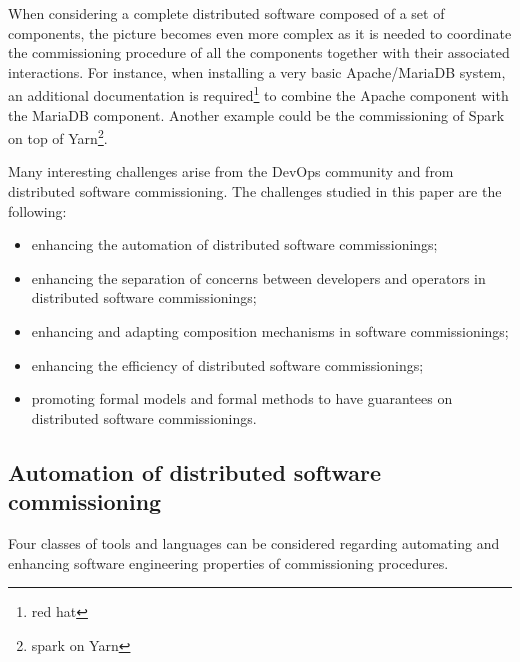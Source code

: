 
When considering a complete distributed software composed of a set of
components, the picture becomes even more complex as it is needed to
coordinate the commissioning procedure of all the components together
with their associated interactions. For instance, when installing a
very basic Apache/MariaDB system, an additional documentation is
required\footnote{red hat} to combine the Apache component with the
MariaDB component. Another example could be the commissioning of Spark
on top of Yarn\footnote{spark on Yarn}.

Many interesting challenges arise from the DevOps community and from
distributed software commissioning. The challenges studied in this
paper are the following:
\begin{itemize}
\item enhancing the automation of distributed software commissionings;
\item enhancing the separation of concerns between developers and
  operators in distributed software commissionings;
\item enhancing and adapting composition mechanisms in software
  commissionings;
\item enhancing the efficiency of distributed software commissionings;
\item promoting formal models and formal methods to have guarantees on
  distributed software commissionings.
\end{itemize}

\subsection{Automation of distributed software commissioning}

Four classes of tools and languages can be considered regarding
automating and enhancing software engineering properties
of commissioning procedures.


